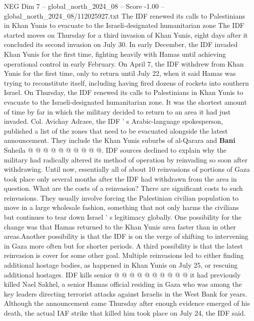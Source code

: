\begin{textsample}{NEG Dim 7 – global\_north\_2024\_08 – Score -1.00 – global\_north\_2024\_08/112025927.txt}  \label{ex:f7_neg_439}
The IDF renewed its calls to Palestinians in Khan Yunis to evacuate to the Israeli-designated humanitarian zone The IDF started moves on Thursday for a third invasion of Khan Yunis, eight days after it concluded its second invasion on July 30.
In early December, the IDF invaded Khan Yunis for the first time, fighting heavily with Hamas until achieving operational control in early February.
On April 7, the IDF withdrew from Khan Yunis for the first time, only to return until July 22, when it said Hamas was trying to reconstitute itself, including having fired dozens of rockets into southern Israel.
On Thursday, the IDF renewed its calls to Palestinians in Khan Yunis to evacuate to the Israeli-designated humanitarian zone.
It was the shortest amount of time by far in which the military decided to return to an area it had just invaded.
Col.
Avichay Adraee, the IDF ' s Arabic-language spokesperson, published a list of the zones that need to be evacuated alongside the latest announcement.
They include the Khan Yunis suburbs of al-Qarara and \textbf{Bani} Suheila @ @ @ @ @ @ @ @ @ @.
IDF sources declined to explain why the military had radically altered its method of operation by reinvading so soon after withdrawing.
Until now, essentially all of about 10 reinvasions of portions of Gaza took place only several months after the IDF had withdrawn from the area in question.
What are the costs of a reinvasion?
There are significant costs to such reinvasions.
They usually involve forcing the Palestinian civilian population to move in a large wholesale fashion, something that not only harms the civilians but continues to tear down Israel ' s legitimacy globally.
One possibility for the change was that Hamas returned to the Khan Yunis area faster than in other areas.Another possibility is that the IDF is on the verge of shifting to intervening in Gaza more often but for shorter periods.
A third possibility is that the latest reinvasion is cover for some other goal.
Multiple reinvasions led to either finding additional hostage bodies, as happened in Khan Yunis on July 25, or rescuing additional hostages.
IDF kills senior @ @ @ @ @ @ @ @ @ @ it had previously killed Nael Sakhel, a senior Hamas official residing in Gaza who was among the key leaders directing terrorist attacks against Israelis in the West Bank for years.
Although the announcement came Thursday after enough evidence emerged of his death, the actual IAF strike that killed him took place on July 24, the IDF said.

\end{textsample}
